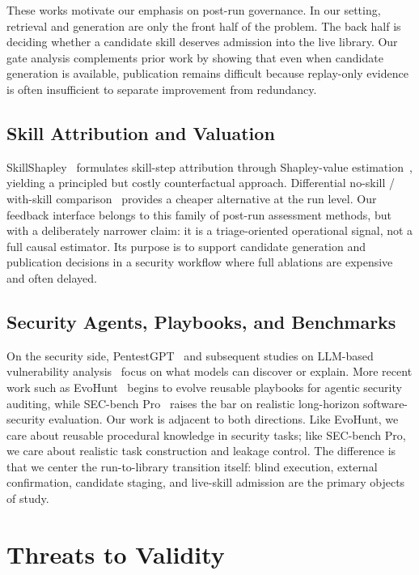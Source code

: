 ﻿\documentclass[preprint,12pt]{elsarticle}
\begin{document}
These works motivate our emphasis on post-run governance.  In our setting,
retrieval and generation are only the front half of the problem.  The back
half is deciding whether a candidate skill deserves admission into the live
library.  Our gate analysis complements prior work by showing that even
when candidate generation is available, publication remains difficult
because replay-only evidence is often insufficient to separate improvement
from redundancy.

\subsection{Skill Attribution and Valuation}

SkillShapley~\cite{skillshapley} formulates skill-step attribution through
Shapley-value estimation~\cite{shapley}, yielding a principled but costly
counterfactual approach.  Differential no-skill / with-skill
comparison~\cite{skillharmful} provides a cheaper alternative at the run
level.  Our feedback interface belongs to this family of post-run
assessment methods, but with a deliberately narrower claim: it is a
triage-oriented operational signal, not a full causal estimator.  Its
purpose is to support candidate generation and publication decisions in a
security workflow where full ablations are expensive and often delayed.

\subsection{Security Agents, Playbooks, and Benchmarks}

On the security side, PentestGPT~\cite{pentestgpt} and subsequent studies
on LLM-based vulnerability analysis~\cite{gpt4vuln,aslr} focus on what
models can discover or explain.  More recent work such as
EvoHunt~\cite{evohunt} begins to evolve reusable playbooks for agentic
security auditing, while SEC-bench Pro~\cite{secbenchpro} raises the bar on
realistic long-horizon software-security evaluation.  Our work is adjacent
to both directions.  Like EvoHunt, we care about reusable procedural
knowledge in security tasks; like SEC-bench Pro, we care about realistic
task construction and leakage control.  The difference is that we center
the run-to-library transition itself: blind execution, external
confirmation, candidate staging, and live-skill admission are the primary
objects of study.

\section{Threats to Validity}
\label{sec:threats}
\end{document}
